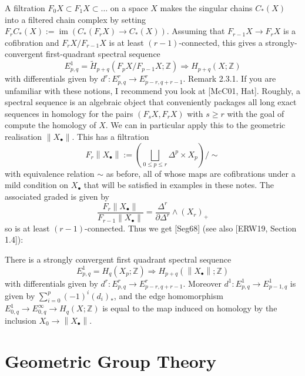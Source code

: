 
A filtration $F_0 X \subset F_1 X \subset \ldots$ on a space $X$ makes the singular chains $C_*(X)$ into a filtered chain complex by setting $F_r C_*(X):=\operatorname{im}\left(C_*\left(F_r X\right) \rightarrow C_*(X)\right)$. Assuming that $F_{r-1} X \rightarrow F_r X$ is a cofibration and $F_r X / F_{r-1} X$ is at least $(r-1)$-connected, this gives a strongly-convergent first-quadrant spectral sequence
$$
E_{p, q}^1=\widetilde{H}_{p+q}\left(F_p X / F_{p-1} X ; \mathbb{Z}\right) \Longrightarrow H_{p+q}(X ; \mathbb{Z})
$$
with differentials given by $d^r: E_{p, q}^r \rightarrow E_{p-r, q+r-1}^r$.
Remark 2.3.1. If you are unfamiliar with these notions, I recommend you look at [McC01, Hat]. Roughly, a spectral sequence is an algebraic object that conveniently packages all long exact sequences in homology for the pairs $\left(F_s X, F_r X\right)$ with $s \geq r$ with the goal of compute the homology of $X$.
We can in particular apply this to the geometric realisation $\left\|X_{\bullet}\right\|$. This has a filtration
$$
F_r\left\|X_{\bullet}\right\|:=\left(\bigsqcup_{0 \leq p \leq r} \Delta^p \times X_p\right) / \sim
$$
with equivalence relation $\sim$ as before, all of whose maps are cofibrations under a mild condition on $X_{\bullet}$ that will be satisfied in examples in these notes. The associated graded is given by
$$
\frac{F_r\left\|X_{\bullet}\right\|}{F_{r-1}\left\|X_{\bullet}\right\|}=\frac{\Delta^r}{\partial \Delta^r} \wedge\left(X_r\right)_{+}
$$
so is at least $(r-1)$-connected. Thus we get [Seg68] (see also [ERW19, Section 1.4]):

\begin{theo}
    There is a strongly convergent first quadrant spectral sequence
    $$
    E_{p, q}^1=H_q\left(X_p ; \mathbb{Z}\right) \Longrightarrow H_{p+q}\left(\left\|X_{\bullet}\right\| ; \mathbb{Z}\right)
    $$
    with differentials given by $d^r: E_{p, q}^r \rightarrow E_{p-r, q+r-1}^r$. Moreover $d^1: E_{p, q}^1 \rightarrow E_{p-1, q}^1$ is given by $\sum_{i=0}^p(-1)^i\left(d_i\right)_*$, and the edge homomorphism $E_{0, q}^1 \rightarrow E_{0, q}^{\infty} \rightarrow H_q(X ; \mathbb{Z})$ is equal to the map induced on homology by the inclusion $X_0 \rightarrow\left\|X_{\bullet}\right\|$.   
\end{theo}







\chapter{Geometric Group Theory}

